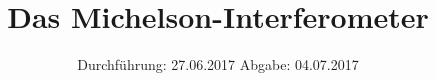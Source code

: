 


\subject{V416}
\title{\texorpdfstring{Das Michelson-Interferometer}{}}
\date{
	Durchführung: 27.06.2017
	\hspace{4em}
	Abgabe: 04.07.2017
}


	\maketitle
	\newpage
	\tableofcontents
	\newpage
	
	
	
	
	
	
	\newpage

	\printbibliography
